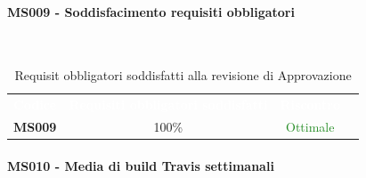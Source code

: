 \paragraph{MS009 - Soddisfacimento requisiti obbligatori}\mbox{}\\[0,3cm]
    \begin{table}[H]
        \centering
        \begin{tabular}{cccc}
        \rowcolor{greySWEight}
        \textcolor{white}{\textbf{Codice}} &
        \textcolor{white}{\textbf{Requisiti obbligatori soddisfatti}} &
        \textcolor{white}{\textbf{Riscontro}}\\
        \textbf{MS009}& 100\% & \textcolor{ForestGreen}{Ottimale} \\

        \end{tabular}
        \caption{Requisit obbligatori soddisfatti alla revisione di Approvazione}
    \end{table}

\paragraph{MS010 - Media di build Travis settimanali}\mbox{}\\[0,3cm]
    

